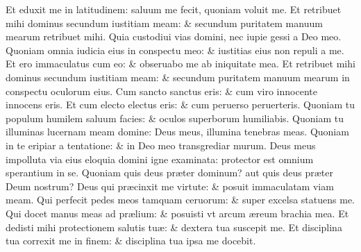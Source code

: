 \documentclass[a5paper,10pt]{book}
\def\ae{æ}
\begin{document}
\begin{multicols*}{2}
\newline \color{red} E\color{black}t eduxit me in latitudinem: saluum me fecit, quoniam voluit me.
\newline \color{red} E\color{black}t retribuet mihi dominus secundum iustitiam meam: \& secundum puritatem manuum mearum retribuet mihi.
\newline \color{red} Q\color{black}uia custodiui vias domini, nec iupie gessi a Deo meo.
\newline \color{red} Q\color{black}uoniam omnia iudicia eius in conspectu meo: \& iustitias eius non repuli a me.
\newline \color{red} E\color{black}t ero immaculatus cum eo: \& obseruabo me ab iniquitate mea.
\newline \color{red} E\color{black}t retribuet mihi dominus secundum iustitiam meam: \& secundum puritatem manuum mearum in conspectu oculorum eius.
\newline \color{red} C\color{black}um sancto sanctus eris: \& cum viro innocente innocens eris.
\newline \color{red} E\color{black}t cum electo electus eris: \& cum peruerso peruerteris.
\newline \color{red} Q\color{black}uoniam tu populum humilem saluum facies: \& oculos superborum humiliabis.
\newline \color{red} Q\color{black}uoniam tu illuminas lucernam meam domine: Deus meus, illumina tenebras meas.
\newline \color{red} Q\color{black}uoniam in te eripiar a tentatione: \& in Deo meo transgrediar murum.
\newline \color{red} D\color{black}eus meus impolluta via eius eloquia domini igne examinata: protector est omnium sperantium in se.
\newline \color{red} Q\color{black}uoniam quis deus pr\ae ter dominum? aut quis deus pr\ae ter Deum nostrum?
\newline \color{red} D\color{black}eus qui pr\ae cinxit me virtute: \& posuit immaculatam viam meam.
\newline \color{red} Q\color{black}ui perfecit pedes meos tamquam ceruorum: \& super excelsa statuens me.
\newline \color{red} Q\color{black}ui docet manus meas ad pr\ae lium: \& posuisti vt arcum \ae reum brachia mea.
\newline \color{red} E\color{black}t dedisti mihi protectionem salutis tu\ae : \& dextera tua suscepit me.
\newline \color{red} E\color{black}t disciplina tua correxit me in finem: \& disciplina tua ipsa me docebit.

\end{multicols*}
\end{document}
